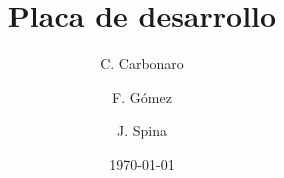 \documentclass[xcolor={usenames}]{beamer}
\title[Informe final]{Placa de desarrollo}
\author[Carbonaro, Gomez, Spina]{C. Carbonaro \and F. Gómez \and J. Spina}
\institute[FIUBA]{
\begin{figure}
    \centering
    \texttt{[image: fiuba]} 
\end{figure}
Universidad de Buenos Aires\\
Facultad de ingeniería}
\date{\today}
\begin{document}
\frame{\titlepage}






\end{document}
